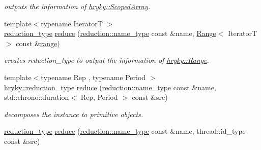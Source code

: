 \begin{DoxyCompactItemize}
\begin{DoxyCompactList}\small\item\em outputs the information of \hyperlink{classhryky_1_1_scoped_array}{hryky\-::\-Scoped\-Array}. \end{DoxyCompactList}\item 
\hypertarget{namespacehryky_aa954d2cf6f43a8ae87f6bbf18331ef3e}{{\footnotesize template$<$typename Iterator\-T $>$ }\\\hyperlink{namespacehryky_a343a9a4c36a586be5c2693156200eadc}{reduction\-\_\-type} \hyperlink{namespacehryky_aa954d2cf6f43a8ae87f6bbf18331ef3e}{reduce} (\hyperlink{namespacehryky_1_1reduction_ac686c30a4c8d196bbd0f05629a6b921f}{reduction\-::name\-\_\-type} const \&name, \hyperlink{classhryky_1_1_range}{Range}$<$ Iterator\-T $>$ const \&\hyperlink{namespacehryky_a6093192359bc9630d58d6158bd0178f4}{range})}\label{namespacehryky_aa954d2cf6f43a8ae87f6bbf18331ef3e}

\begin{DoxyCompactList}\small\item\em creates reduction\-\_\-type to output the information of \hyperlink{classhryky_1_1_range}{hryky\-::\-Range}. \end{DoxyCompactList}\item 
\hypertarget{namespacehryky_af41cb3af6766761da0ff21b84527a52c}{{\footnotesize template$<$typename Rep , typename Period $>$ }\\\hyperlink{namespacehryky_a343a9a4c36a586be5c2693156200eadc}{hryky\-::reduction\-\_\-type} \hyperlink{namespacehryky_af41cb3af6766761da0ff21b84527a52c}{reduce} (\hyperlink{namespacehryky_1_1reduction_ac686c30a4c8d196bbd0f05629a6b921f}{reduction\-::name\-\_\-type} const \&name, std\-::chrono\-::duration$<$ Rep, Period $>$ const \&src)}\label{namespacehryky_af41cb3af6766761da0ff21b84527a52c}

\begin{DoxyCompactList}\small\item\em decomposes the instance to primitive objects. \end{DoxyCompactList}\item 
\hypertarget{namespacehryky_a83cec18466ae6cb98072e1788d98b7fa}{\hyperlink{namespacehryky_a343a9a4c36a586be5c2693156200eadc}{reduction\-\_\-type} \hyperlink{namespacehryky_a83cec18466ae6cb98072e1788d98b7fa}{reduce} (\hyperlink{namespacehryky_1_1reduction_ac686c30a4c8d196bbd0f05629a6b921f}{reduction\-::name\-\_\-type} const \&name, thread\-::id\-\_\-type const \&src)}\label{namespacehryky_a83cec18466ae6cb98072e1788d98b7fa}


\end{DoxyCompactItemize}
